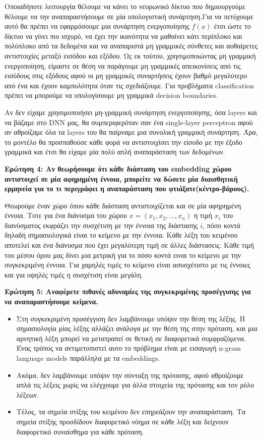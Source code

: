 \documentclass[12pt]{article}
\begin{document}
Οποιαδήποτε λειτουργία θέλουμε να κάνει το νευρωνικό δίκτυο που δημιουργούμε θέλουμε να την αναπαραστήσουμε σε μία υπολογιστική συνάρτηση.Για να πετύχουμε αυτό θα πρέπει να εφαρμόσουμε μια συνάρτηση ενεργοποίησης $f(x)$ έτσι ώστε το δίκτυο να γίνει πιο ισχυρό, να έχει την ικανότητα να μαθαίνει κάτι περίπλοκο και πολύπλοκο από τα δεδομένα και να αναπαριστά μη γραμμικές σύνθετες και αυθαίρετες αντιστοιχίες μεταξύ εισόδου και εξόδου. Ως εκ τούτου, χρησιμοποιώντας μη γραμμική ενεργοποίηση, είμαστε σε θέση να παράγουμε μη γραμμικές απεικονίσεις από τις εισόδους στις εξόδους αφού οι μη γραμμικές συναρτήσεις έχουν βαθμό μεγαλύτερο από ένα και έχουν καμπυλότητα όταν τις σχεδιάζουμε. Για προβλήματα classification πρέπει να μπορούμε να υπολογίσουμε μη γραμμικά decision boundaries.

Αν δεν είχαμε χρησιμοποιήσει μη-γραμμική συνάρτηση ενεργοποίησης, όσα layers και να βάζαμε στο DNN μας, θα συμπεριφερόταν σαν ένα single-layer perceptron αφού αν αθροίζαμε όλα τα layers του θα παίρναμε μια συνολική γραμμική συνάρτηση. Άρα, το μοντέλο θα προσπαθούσε κάθε φορά να αντιστοιχίσει την είσοδο με την έξοδο γραμμικά 
και έτσι θα είχαμε μία πολύ απλή αναπαράσταση των δεδομένων.  

\textbf{Ερώτηση 4: Αν θεωρήσουμε ότι κάθε διάσταση του embedding χώρου αντιστοιχεί σε μία αφηρημένη έννοια, μπορείτε να δώσετε μία διαισθητική ερμηνεία για το τι περιγράφει η αναπαράσταση που φτιάξατε(κέντρο-βάρους).}

Θεωρούμε έναν χώρο όπου κάθε διάσταση αντιστοιχίζεται και σε μία αφηρημένη έννοια. Τοτε για ένα διάνυσμα του χώρου $x = (x_1,x_2,...,x_n)$ η τιμή $x_i$ του διανύσματος εκφράζει την συσχέτιση με την έννοια της διάστασης $i$, πόσο κοντά δηλαδή σημασιολογικά είναι το κείμενο με την έννοια. Κάθε λέξη του κειμένου αποτελεί και ένα διάνυσμα που έχει μεγαλύτερη τιμή σε άλλες διάστασεις. Κάθε τιμή του μέσου όρου μας δίνει μια μετρική για το πόσο κοντά ειναι το κείμενο με την συγκεκριμένη έννοια. Για χαμηλές τιμές το κείμενο είναι ασυσχέτιστο με τις έννοιες και για υψηλές τιμές η συσχέτιση είναι μεγάλη. 

\textbf{Ερώτηση 5: Αναφέρετε πιθανές αδυναμίες της συγκεκριμένης προσέγγισης για να αναπαραστήσουμε κείμενα.}

\begin{itemize}
    \item Στη συγκεκριμένη προσέγγιση δεν λαμβάνουμε υπόψιν την θέση της λέξης. Η σημασιολογία μίας λέξης αλλάζει ανάλογα με την θέση της στην πρόταση, και μια αρνητική λέξη μπορεί να μετατραπεί σε θετική σε διαφορετικά συμφραζόμενα. Ένας τρόπος να αντιμετοπιστεί αυτο το πρόβλημα είναι με εισαγωγή n-gram language models παράλληλα με τα embeddings.
    \item Ακόμα, δεν λαμβάνουμε υπόψιν την σύνταξη της πρότασης, αφού αθροίζουμε απλά τις λέξεις χωρίς να ελέγχουμε για άλλα στοιχεία της πρότασης και τον  ρόλο λέξεων. 
    \item Τέλος, τα σημεία στίξης του κειμένου δεν επηρεάζουν την αναπαράσταση. Τα σημεία στίξης προσδίδουν διαφορετικό νόημα σε κάθε λέξη και δείχνουν διαφορετικό συναίσθημα για κάθε πρόταση.
\end{itemize}
\end{document}
